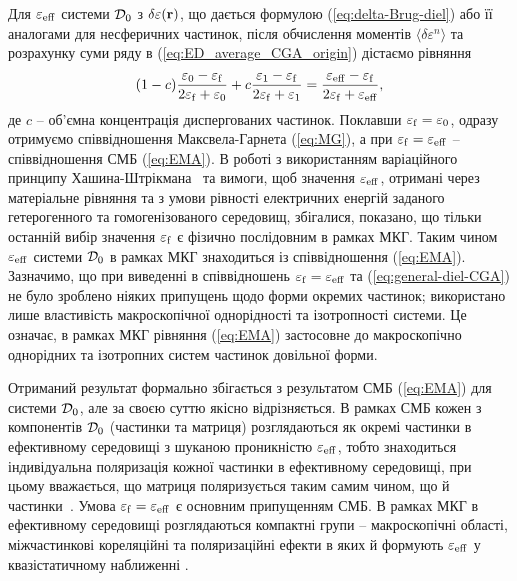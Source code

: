 \documentclass[14pt,twoside]{vakthesis}
\begin{document}
Для $\varepsilon_{\rm eff}$ системи ${\cal D}_0$ з $\delta\varepsilon ({\bf r})$, що дається формулою (\ref{eq:delta-Brug-diel}) або її аналогами для несферичних частинок, після обчислення моментів $\langle \delta\varepsilon^n \rangle$ та розрахунку суми ряду  в (\ref{eq:ED_average_CGA_origin}) дістаємо рівняння 
\begin{equation}\label{eq:general-diel-CGA}
(1 - c) \frac{{\varepsilon}_0 - {\varepsilon}_{\rm f}}{2{\varepsilon}_{\rm f} + {\varepsilon}_0} + 
c \frac{{\varepsilon}_1 - {\varepsilon}_{\rm f}}{2{\varepsilon}_{\rm f} + {\varepsilon}_1} = \frac{\varepsilon_{\rm eff} - \varepsilon_{\rm f}}{2\varepsilon_{\rm f} + \varepsilon_{\rm eff}},
\end{equation}
де $c$  -- об'ємна концентрація диспергованих частинок.
Поклавши $\varepsilon_{\rm f} = \varepsilon_{0}$, одразу отримуємо співвідношення Максвела-Гарнета (\ref{eq:MG}), а при $\varepsilon_{\rm f} = \varepsilon_{\rm eff}$ -- співвідношення СМБ (\ref{eq:EMA}). В роботі \cite{Sushko2017} з використанням варіаційного принципу Хашина-Штрікмана~\cite{HS1962} та вимоги, щоб значення $\varepsilon_{\rm eff}$, отримані через матеріальне рівняння та з умови рівності електричних енергій заданого гетерогенного та гомогенізованого середовищ, збігалися, показано, що тільки останній вибір значення $\varepsilon_{\rm f}$ є фізично послідовним в рамках МКГ. Таким чином ${\varepsilon}_{\rm eff}$ системи ${\cal D}_0$ в рамках МКГ знаходиться із співвідношення (\ref{eq:EMA}).  Зазначимо, що при виведенні в \cite{Sushko2017} співвідношень $\varepsilon_{\rm f} = \varepsilon_{\rm eff}$ та (\ref{eq:general-diel-CGA}) не було зроблено ніяких припущень щодо форми окремих частинок; використано лише властивість макроскопічної однорідності та ізотропності системи. Це означає, в рамках МКГ рівняння (\ref{eq:EMA}) застосовне до макроскопічно однорідних та ізотропних систем частинок довільної форми.

Отриманий результат формально збігається з результатом СМБ (\ref{eq:EMA}) для системи ${\cal D}_0$, але за своєю суттю якісно відрізняється. В рамках СМБ кожен з компонентів ${\cal D}_0$ (частинки та матриця) розглядаються як окремі частинки в ефективному середовищі з шуканою проникністю $\varepsilon_{\rm eff}$, тобто знаходиться індивідуальна  поляризація кожної частинки  в ефективному середовищі, при цьому вважається, що матриця поляризується таким самим чином, що й частинки~\cite{Banheg1986}. Умова $\varepsilon_{\rm f} = \varepsilon_{\rm eff}$ є основним припущенням  СМБ. В рамках МКГ в ефективному середовищі розглядаються компактні групи -- макроскопічні області, міжчастинкові кореляційні та поляризаційні ефекти в яких й формують $\varepsilon_{\rm eff}$ у квазістатичному наближенні \cite{Sushko2017}. 
\end{document}
